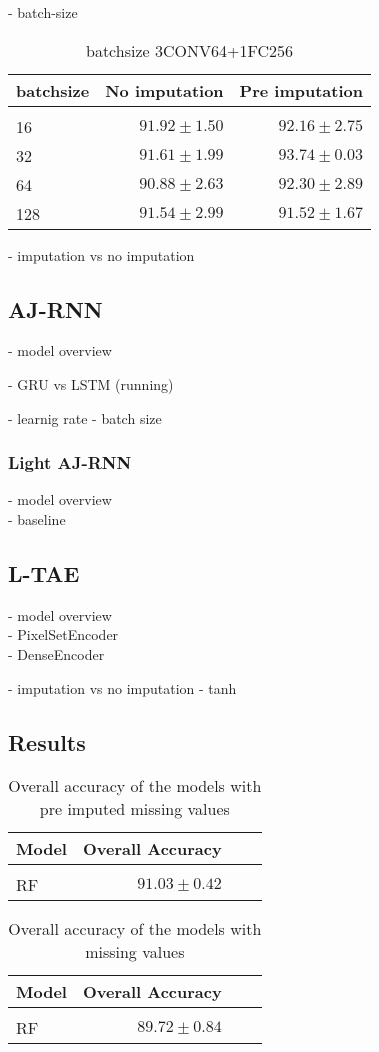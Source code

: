 - batch-size

\begin{table}[!htbp]
  \centering
   \begin{tabular}{lrr}
   batchsize                  & No imputation         & Pre imputation             \\[0.2cm]
   \hline \\[-0.2cm]
    16  	 & $91.92 \pm 1.50$ 	 & $92.16 \pm 2.75$\\
    32  	 & $\mathbf{91.61 \pm 1.99}$ 	 & $\mathbf{93.74 \pm 0.03}$\\
    64  	 & $90.88 \pm 2.63$ 	 & $92.30 \pm 2.89$\\
    128  	 & $91.54 \pm 2.99$ 	 & $91.52 \pm 1.67$\\
   \end{tabular}
   \caption{batchsize 3CONV64+1FC256}
 \end{table}

- imputation vs no imputation

\pagebreak
\subsection{AJ-RNN}
- model overview

- GRU vs LSTM (running)

- learnig rate
- batch size 

\subsubsection{Light AJ-RNN}
- model overview\\
- baseline

\subsection{L-TAE}
- model overview\\
- PixelSetEncoder\\
- DenseEncoder

- imputation vs no imputation
- tanh

\subsection{Results}

\begin{table}[!htbp]
  \centering
    \begin{tabular}{lrrr}
    Model                       & Overall Accuracy             \\[0.2cm] 
    \hline \\[-0.2cm]
    RF      & $91.03 \pm 0.42$
    \end{tabular}
  \caption{Overall accuracy of the models with pre imputed missing values} 
\end{table}

\begin{table}[!htbp]
  \centering
    \begin{tabular}{lrrr}
    Model                       & Overall Accuracy             \\[0.2cm] 
    \hline \\[-0.2cm]
    RF  & $89.72 \pm 0.84$
    \end{tabular}
  \caption{Overall accuracy of the models with missing values} 
\end{table}